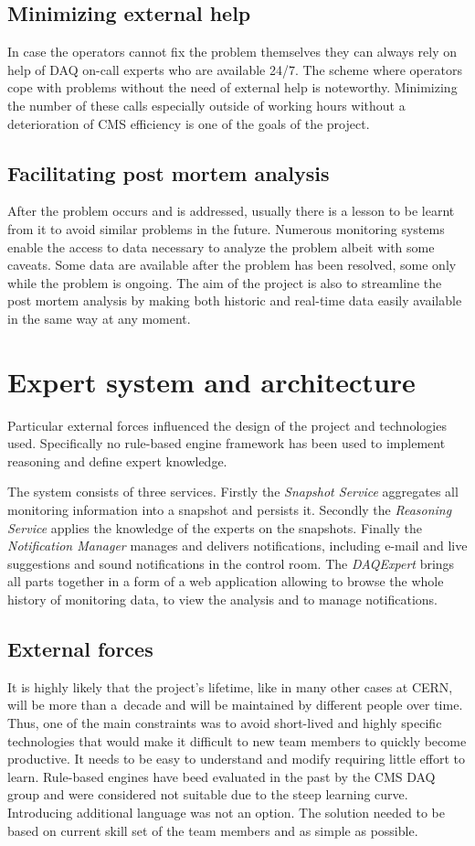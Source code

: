 \documentclass[a4paper]{jpconf}
\begin{document}
\subsection{Minimizing external help}
In case the operators cannot fix the problem themselves they can always rely on help of DAQ on-call experts who are available 24/7. The scheme where operators cope with problems without the need of external help is noteworthy. Minimizing the number of these calls especially outside of working hours without a deterioration of CMS efficiency is one of the goals of the project.


\subsection{Facilitating post mortem analysis}
After the problem occurs and is addressed, usually there is a lesson to be learnt from it to avoid similar problems in the future. Numerous monitoring systems enable the access to data necessary to analyze the problem albeit with some caveats. Some data are available after the problem has been resolved, some only while the problem is ongoing. The aim of the project is also to streamline the post mortem analysis by making both historic and real-time data easily available in the same way at any moment.

\section{Expert system and architecture}
Particular external forces influenced the design of the project and technologies used. Specifically no rule-based engine framework has been used to implement reasoning and define expert knowledge.

The system consists of three services. Firstly the {\it Snapshot Service} aggregates all monitoring information into a snapshot and persists it. Secondly the { \it Reasoning Service} applies the knowledge of the experts on the snapshots. Finally the { \it Notification Manager } manages and delivers notifications, including e-mail and live suggestions and sound notifications in the control room. The { \it DAQExpert } brings all parts together in a form of a web application allowing to browse the whole history of monitoring data, to view the analysis and to manage notifications.

\subsection{External forces}
It is highly likely that the project's lifetime, like in many other cases at CERN, will be more than a~decade and will be maintained by different people over time. Thus, one of the main constraints was to avoid short-lived and highly specific technologies that would make it difficult to new team members to quickly become productive. It needs to be easy to understand and modify requiring little effort to learn. Rule-based engines have beed evaluated in the past by the CMS DAQ group and were considered not suitable due to the steep learning curve. Introducing additional language was not an option. The solution needed to be based on current skill set of the team members and as simple as possible.
\end{document}
